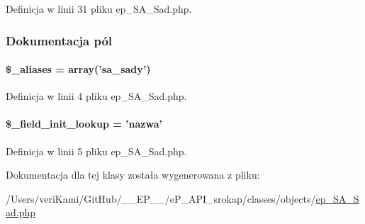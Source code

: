 Definicja w linii 31 pliku ep\-\_\-\-S\-A\-\_\-\-Sad.\-php.



\subsubsection{Dokumentacja pól}
\hypertarget{classep___s_a___sad_ab4e31d75f0bc5d512456911e5d01366b}{
\paragraph[{\$\-\_\-aliases}]{\setlength{\rightskip}{0pt plus 5cm}\$\-\_\-aliases = array('sa\-\_\-sady')}}\label{classep___s_a___sad_ab4e31d75f0bc5d512456911e5d01366b}


Definicja w linii 4 pliku ep\-\_\-\-S\-A\-\_\-\-Sad.\-php.

\hypertarget{classep___s_a___sad_a4a4d54ae35428077a7c61ec8a5139af3}{
\paragraph[{\$\-\_\-field\-\_\-init\-\_\-lookup}]{\setlength{\rightskip}{0pt plus 5cm}\$\-\_\-field\-\_\-init\-\_\-lookup = 'nazwa'}}\label{classep___s_a___sad_a4a4d54ae35428077a7c61ec8a5139af3}


Definicja w linii 5 pliku ep\-\_\-\-S\-A\-\_\-\-Sad.\-php.



Dokumentacja dla tej klasy została wygenerowana z pliku\-:\begin{DoxyCompactItemize}
\item 
/\-Users/veri\-Kami/\-Git\-Hub/\-\_\-\-\_\-\-E\-P\-\_\-\-\_\-/e\-P\-\_\-\-A\-P\-I\-\_\-srokap/classes/objects/\hyperlink{ep___s_a___sad_8php}{ep\-\_\-\-S\-A\-\_\-\-Sad.\-php}\end{DoxyCompactItemize}
